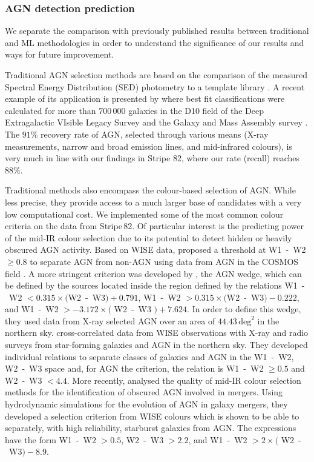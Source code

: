 \documentclass{aa}
\begin{document}
\subsubsection{AGN detection prediction}\label{sec:previous_AGN_detection}

We separate the comparison with previously published results between traditional and ML methodologies in order to understand the significance of our results and ways for future improvement.

Traditional AGN selection methods are based on the comparison of the measured Spectral Energy Distribution (SED) photometry to a template library \citep{2011Ap&SS.331....1W}. A recent example of its application is presented by  \citet{2022MNRAS.509.4940T} where best fit classifications were calculated for more than $700\,000$ galaxies in the D10 field of the Deep Extragalactic VIsible Legacy Survey \citep[DEVILS;][]{2018MNRAS.480..768D} and the Galaxy and Mass Assembly survey \citep[GAMA;][]{2011MNRAS.413..971D, 2015MNRAS.452.2087L}.
The $91 \%$ recovery rate of AGN, selected through various means (X-ray measurements, narrow and broad emission lines, and mid-infrared colours), is very much in line with our findings in Stripe 82, where our rate (recall) reaches $88 \%$.

Traditional methods also encompass the colour-based selection of AGN. While less precise, they provide access to a much larger base of candidates with a very low computational cost. We implemented some of the most common colour criteria on the data from Stripe\,82.
Of particular interest is the predicting power of the mid-IR colour selection due to its potential to detect hidden or heavily obscured AGN activity. 
 Based on WISE \citep{2010AJ....140.1868W} data, \citet[][S12]{2012ApJ...753...30S} proposed a threshold at W1~-~W2 $\geq 0.8$ to separate AGN from non-AGN using data from AGN in the COSMOS field \citep{2007ApJS..172....1S}.
A more stringent criterion was developed by \citet[][M12]{2012MNRAS.426.3271M}, the AGN wedge, which can be defined by the sources located inside the region defined by the relations W1~-~W2 $< 0.315 \times($W2~-~W3$)+ 0.791$, W1~-~W2 $> 0.315 \times($W2~-~W3$)- 0.222$, and W1~-~W2 $> -3.172 \times($ W2~-~W3 $)+ 7.624$. In order to define this wedge, they used data from X-ray selected AGN over an area of $44.43\, \mathrm{deg}^{2}$ in the northern sky.
\citet[M16;][]{2016MNRAS.462.2631M} cross-correlated data from WISE observations with X-ray and radio surveys from star-forming galaxies and AGN in the northern sky. They developed individual relations to separate classes of galaxies and AGN in the W1~-~W2, W2~-~W3 space and, for AGN the criterion, the relation is  W1~-~W2 $\geq 0.5$ and W2~-~W3 $< 4.4$.
More recently, \citet[B18;][]{2018MNRAS.478.3056B} analysed the quality of mid-IR colour selection methods for the identification of obscured AGN involved in mergers. Using hydrodynamic simulations for the evolution of AGN in galaxy mergers, they developed a selection criterion from WISE colours which is shown to be able to separately, with high reliability, starburst galaxies from AGN. The expressions have the form W1~-~W2 $> 0.5$, W2~-~W3 $> 2.2$, and W1~-~W2 $> 2 \times($ W2~-~W3$) -8.9$.
\end{document}
